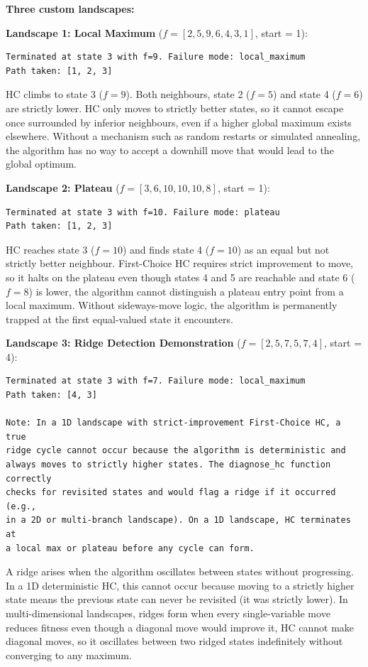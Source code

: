 \documentclass[12pt,a4paper]{article}
\begin{document}
\textbf{Three custom landscapes:}

\textbf{Landscape 1: Local Maximum}
($f = [2, 5, 9, 6, 4, 3, 1]$, start = 1):

\begin{lstlisting}[style=output]
Terminated at state 3 with f=9. Failure mode: local_maximum
Path taken: [1, 2, 3]
\end{lstlisting}

HC climbs to state 3 ($f=9$). Both neighbours, state 2 ($f=5$) and
state 4 ($f=6$) are strictly lower.
HC only moves to strictly better states, so it cannot escape once surrounded
by inferior neighbours, even if a higher global maximum exists elsewhere.
Without a mechanism such as random restarts or simulated annealing, the algorithm
has no way to accept a downhill move that would lead to the global optimum.

\textbf{Landscape 2: Plateau}
($f = [3, 6, 10, 10, 10, 8]$, start = 1):

\begin{lstlisting}[style=output]
Terminated at state 3 with f=10. Failure mode: plateau
Path taken: [1, 2, 3]
\end{lstlisting}

HC reaches state 3 ($f=10$) and finds state 4 ($f=10$) as an equal but not
strictly better neighbour.
First-Choice HC requires strict improvement to move, so it halts on the plateau
even though states 4 and 5 are reachable and state 6 ($f=8$) is lower, the algorithm cannot distinguish a plateau entry point from a local maximum.
Without sideways-move logic, the algorithm is permanently trapped at the first
equal-valued state it encounters.

\textbf{Landscape 3: Ridge Detection Demonstration}
($f = [2, 5, 7, 5, 7, 4]$, start = 4):

\begin{lstlisting}[style=output]
Terminated at state 3 with f=7. Failure mode: local_maximum
Path taken: [4, 3]

Note: In a 1D landscape with strict-improvement First-Choice HC, a true
ridge cycle cannot occur because the algorithm is deterministic and
always moves to strictly higher states. The diagnose_hc function correctly
checks for revisited states and would flag a ridge if it occurred (e.g.,
in a 2D or multi-branch landscape). On a 1D landscape, HC terminates at
a local max or plateau before any cycle can form.
\end{lstlisting}

A ridge arises when the algorithm oscillates between states without progressing.
In a 1D deterministic HC, this cannot occur because moving to a strictly higher
state means the previous state can never be revisited (it was strictly lower).
In multi-dimensional landscapes, ridges form when every single-variable move
reduces fitness even though a diagonal move would improve it, HC cannot make diagonal moves, so it oscillates between two ridged states
indefinitely without converging to any maximum.
\end{document}
